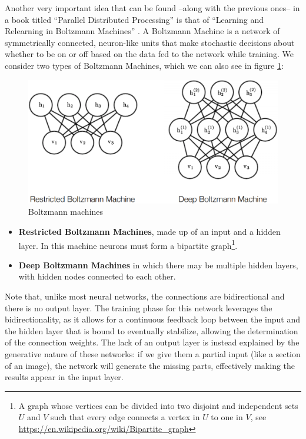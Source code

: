 Another very important idea that can be found --along with the previous ones-- in a book titled ``Parallel Distributed Processing'' is that of ``Learning and Relearning in Boltzmann Machines'' \cite{10.5555/104279.104291}. A Boltzmann Machine is a network of symmetrically connected, neuron-like units that make stochastic decisions about whether to be on or off based on the data fed to the network while training. We consider two types of Boltzmann Machines, which we can also see in figure \ref{fig:ch6-boltzmannmachines}:

\begin{figure}
    \centering
    \includegraphics[scale=0.5]{Images/Chapter 6/boltzmann machines.png}
    \caption{Boltzmann machines}
    \label{fig:ch6-boltzmannmachines}
\end{figure}

\begin{itemize}
    \item \textbf{Restricted Boltzmann Machines}, made up of an input and a hidden layer. In this machine neurons must form a bipartite graph\footnote{A graph whose vertices can be divided into two disjoint and independent sets $U$ and $V$ such that every edge connects a vertex in $U$ to one in $V$, see \url{https://en.wikipedia.org/wiki/Bipartite_graph}}.
    \item \textbf{Deep Boltzmann Machines} in which there may be multiple hidden layers, with hidden nodes connected to each other.
\end{itemize}

Note that, unlike most neural networks, the connections are bidirectional and there is no output layer. The training phase for this network leverages the bidirectionality, as it allows for a continuous feedback loop between the input and the hidden layer that is bound to eventually stabilize, allowing the determination of the connection weights. The lack of an output layer is instead explained by the generative nature of these networks: if we give them a partial input (like a section of an image), the network will generate the missing parts, effectively making the results appear in the input layer.

